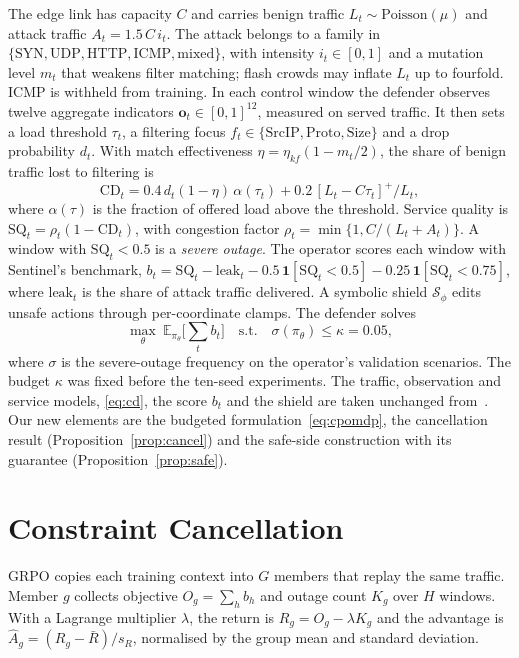 \documentclass[journal]{IEEEtran}
\begin{document}
The edge link has capacity $C$ and carries benign traffic $L_t\sim\mathrm{Poisson}(\mu)$ and attack traffic $A_t=1.5\,C\,i_t$. The attack belongs to a family in $\{\mathrm{SYN},\mathrm{UDP},\mathrm{HTTP},\mathrm{ICMP},\mathrm{mixed}\}$, with intensity $i_t\in[0,1]$ and a mutation level $m_t$ that weakens filter matching; flash crowds may inflate $L_t$ up to fourfold. ICMP is withheld from training. In each control window the defender observes twelve aggregate indicators $\mathbf{o}_t\in[0,1]^{12}$, measured on served traffic. It then sets a load threshold $\tau_t$, a filtering focus $f_t\in\{\mathrm{SrcIP},\mathrm{Proto},\mathrm{Size}\}$ and a drop probability $d_t$. With match effectiveness $\eta=\eta_{kf}(1-m_t/2)$, the share of benign traffic lost to filtering is
\begin{equation}
\mathrm{CD}_t = 0.4\,d_t(1-\eta)\,\alpha(\tau_t) + 0.2\,[L_t-C\tau_t]^+/L_t ,
\label{eq:cd}
\end{equation}
where $\alpha(\tau)$ is the fraction of offered load above the threshold. Service quality is $\mathrm{SQ}_t=\rho_t(1-\mathrm{CD}_t)$, with congestion factor $\rho_t=\min\{1,C/(L_t+A_t)\}$. A window with $\mathrm{SQ}_t<0.5$ is a \emph{severe outage}. The operator scores each window with Sentinel's benchmark,
$b_t=\mathrm{SQ}_t-\mathrm{leak}_t-0.5\,\mathbf{1}[\mathrm{SQ}_t<0.5]-0.25\,\mathbf{1}[\mathrm{SQ}_t<0.75]$,
where $\mathrm{leak}_t$ is the share of attack traffic delivered. A symbolic shield $\mathcal{S}_\phi$ edits unsafe actions through per-coordinate clamps. The defender solves
\begin{equation}
\max_\theta\ \mathbb{E}_{\pi_\theta}\Big[\textstyle\sum_t b_t\Big]\quad\text{s.t.}\quad \sigma(\pi_\theta)\le\kappa=0.05 ,
\label{eq:cpomdp}
\end{equation}
where $\sigma$ is the severe-outage frequency on the operator's validation scenarios. The budget $\kappa$ was fixed before the ten-seed experiments. The traffic, observation and service models, \eqref{eq:cd}, the score $b_t$ and the shield are taken unchanged from~\cite{alfatemi2026sentinel}. Our new elements are the budgeted formulation~\eqref{eq:cpomdp}, the cancellation result (Proposition~\ref{prop:cancel}) and the safe-side construction with its guarantee (Proposition~\ref{prop:safe}).

\section{Constraint Cancellation}
\label{sec:mechanism}
GRPO copies each training context into $G$ members that replay the same traffic. Member $g$ collects objective $O_g=\sum_h b_h$ and outage count $K_g$ over $H$ windows. With a Lagrange multiplier $\lambda$, the return is $R_g=O_g-\lambda K_g$ and the advantage is $\hat A_g=(R_g-\bar R)/s_R$, normalised by the group mean and standard deviation.
\end{document}
